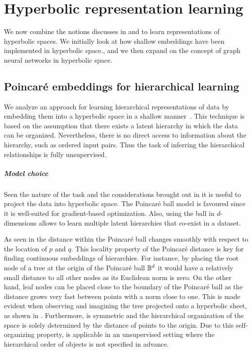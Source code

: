 \chapter{Hyperbolic representation learning}\label{hrl}
We now combine the notions discusses in  and  to learn representations of hyperbolic spaces. We initially look at how shallow embeddings have been implemented in hyperbolic space., and we then expand on the concept of graph neural networks in hyperbolic space.

\section{Poincaré embeddings for hierarchical learning}
We analyze an approach for learning hierarchical representations of data by embedding them into a hyperbolic space in a shallow manner~\cite{nickel2017poincare}. This technique is based on the assumption that there exists a latent hierarchy in which the data can be organized. Nevertheless, there is no direct access to information about the hierarchy, such as ordered input pairs. Thus the task of inferring the hierarchical relationships is fully unsupervised. 

\paragraph{Model choice}
Seen the nature of the task and the considerations brought out in  it is useful to project the data into hyperbolic space. The Poincaré ball model is favoured since it is well-suited for gradient-based optimization. Also, using the ball in $d$-dimensions allows to learn multiple latent hierarchies that co-exist in a dataset. 

As seen in  the distance within the Poincaré ball changes smoothly with respect to the location of $p$ and $q$. This locality property of the Poincaré distance is key for finding continuous embeddings of hierarchies. For instance, by placing the root node of a tree at the origin of the Poincaré ball $\mathbb{B}^d$ it would have a relatively small distance to all other nodes as its Euclidean norm is zero. On the other hand, leaf nodes can be placed close to the boundary of the Poincaré ball as the distance grows very fast between points with a norm close to one. This is made evident when observing  and imagining the tree projected onto a hyperbolic sheet, as shown in . Furthermore,  is symmetric and the hierarchical organization of the space is solely determined by the distance of points to the origin. Due to this self-organizing property,  is applicable in an unsupervised setting where the hierarchical order of objects is not specified in advance. 

